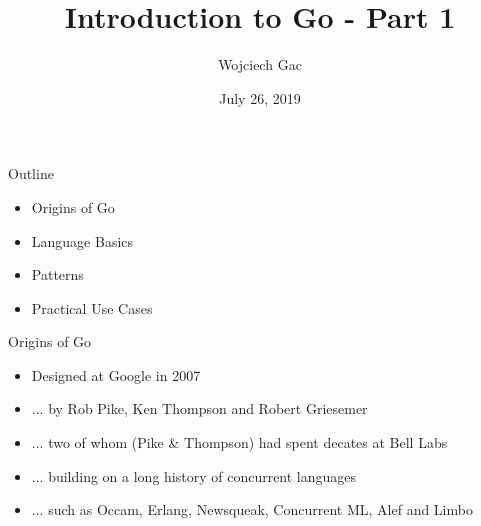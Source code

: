 \documentclass[pdf,xcolor=dvipsnames,noparindent]{beamer}
\title{Introduction to Go - Part 1}
\author{Wojciech Gac}
\date{July 26, 2019}
\begin{document}
\begin{frame}
	\titlepage
\end{frame}


	  

\begin{frame}{Outline}
  \pause
  \begin{itemize}
  \item Origins of Go
    \pause
  \item Language Basics
    \pause
  \item Patterns
    \pause
  \item Practical Use Cases
    \pause
  \end{itemize}
\end{frame}

\begin{frame}{Origins of Go}
  \pause
  \begin{itemize}
  \item Designed at Google in 2007
    \pause
  \item ... by Rob Pike, Ken Thompson and Robert Griesemer
    \pause
  \item ... two of whom (Pike \& Thompson) had spent decates at Bell Labs
    \pause
  \item ... building on a long history of concurrent languages
    \pause
  \item ... such as Occam, Erlang, Newsqueak, Concurrent ML, Alef and Limbo
  \end{itemize}
  
\end{frame}
\end{document}
